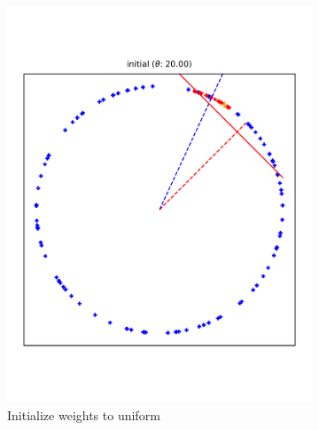 \documentclass{article} %
\begin{document}
\begin{figure}
	\centering
	\captionsetup{labelformat=empty}
	\begin{subfigure}{0.30\textwidth}
		\includegraphics[width=\textwidth, clip=true, trim=12mm 40mm 12mm 35mm]{iter_00}
		\caption{Initialize weights to uniform}
		\label{fig:iter_00}
	\end{subfigure}
	\begin{subfigure}{0.30\textwidth}

\end{subfigure}
\end{figure}
\end{document}
